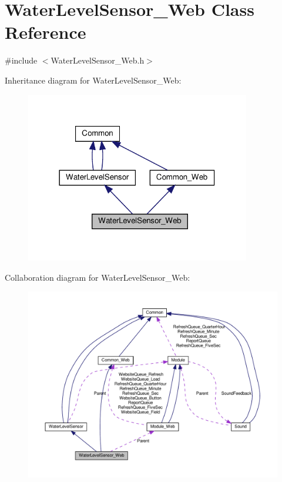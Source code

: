 \hypertarget{class_water_level_sensor___web}{}\section{Water\+Level\+Sensor\+\_\+\+Web Class Reference}
\label{class_water_level_sensor___web}


{\ttfamily \#include $<$Water\+Level\+Sensor\+\_\+\+Web.\+h$>$}



Inheritance diagram for Water\+Level\+Sensor\+\_\+\+Web\+:
\nopagebreak
\begin{figure}[H]
\begin{center}
\leavevmode
\includegraphics[width=278pt]{class_water_level_sensor___web__inherit__graph}
\end{center}
\end{figure}


Collaboration diagram for Water\+Level\+Sensor\+\_\+\+Web\+:
\nopagebreak
\begin{figure}[H]
\begin{center}
\leavevmode
\includegraphics[width=350pt]{class_water_level_sensor___web__coll__graph}
\end{center}
\end{figure}
